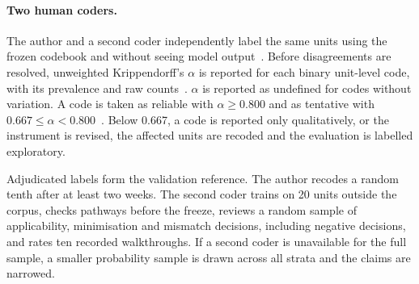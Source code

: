 \paragraph{Two human coders.} The author and a second coder independently label the same units
using the frozen codebook and without seeing model
output~\parencite{campbell2013coding,oconnor2020intercoder}. Before disagreements are resolved,
unweighted Krippendorff's $\alpha$ is reported for each binary unit-level code, with its
prevalence and raw counts~\parencite{feinstein1990high}. $\alpha$ is reported as undefined for
codes without variation. A code is taken as reliable with $\alpha\geq0.800$ and as tentative
with $0.667\leq\alpha<0.800$~\parencite[pp.~356--357]{krippendorff2019content}\parencite{mcdonald2019reliability}.
Below 0.667, a code is reported only qualitatively, or the instrument is revised, the affected
units are recoded and the evaluation is labelled exploratory.

Adjudicated labels form the validation reference. The author recodes a random tenth after at
least two weeks. The second coder trains on 20 units outside the corpus, checks pathways before
the freeze, reviews a random sample of applicability, minimisation and mismatch decisions,
including negative decisions, and rates ten recorded walkthroughs. If a second coder is
unavailable for the full sample, a smaller probability sample is drawn across all strata and the
claims are narrowed.
